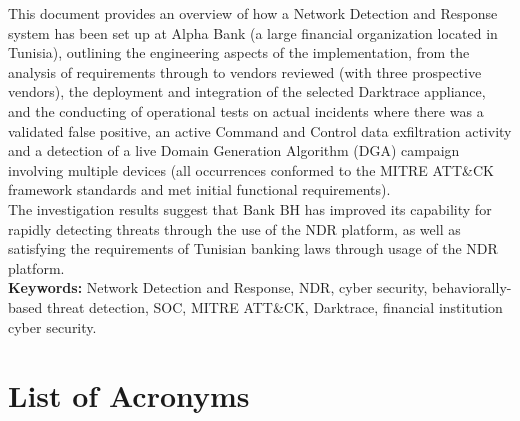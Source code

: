 \documentclass[12pt,a4paper]{report}
\begin{document}
This document provides an overview of how a Network Detection and Response system has been set up at Alpha Bank (a large financial organization located in Tunisia), outlining the engineering aspects of the implementation, from the analysis of requirements through to vendors reviewed (with three prospective vendors), the deployment and integration of the selected Darktrace appliance, and the conducting of operational tests on actual incidents where there was a validated false positive, an active Command and Control data exfiltration activity and a detection of a live Domain Generation Algorithm (DGA) campaign involving multiple devices (all occurrences conformed to the MITRE ATT\&CK framework standards and met initial functional requirements).\\

The investigation results suggest that Bank BH has improved its capability for rapidly detecting threats through the use of the NDR platform, as well as satisfying the requirements of Tunisian banking laws through usage of the NDR platform.\\

\textbf{Keywords:} Network Detection and Response, NDR, cyber security, behaviorally-based threat detection, SOC, MITRE ATT\&CK, Darktrace, financial institution cyber security.



\tableofcontents
\listoffigures
\listoftables

\chapter*{List of Acronyms}

\renewcommand{\arraystretch}{1.4}
\end{document}
